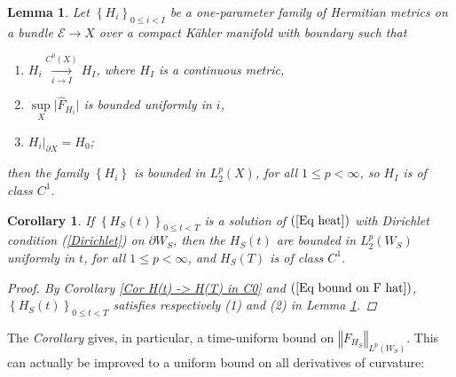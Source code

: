 \documentclass{article}
\newtheorem{corollary}[theorem]{Corollary}
\newtheorem{lemma}[theorem]{Lemma}
\begin{document}
\begin{lemma}           \label{Lemma Hi is in Lp2}
Let $\left\{ H_{i}\right\} _{0\leq i< I}$ be a
one-parameter family of Hermitian metrics on a bundle $\mathcal{E}%
\rightarrow X$ over a compact K\"{a}hler manifold with boundary such that
\begin{enumerate}
        \item 
        $H_{i}\underset{i\to I}{\overset{C^{0}(X)}{\longrightarrow }}H_{I}$, where $H_{I}$ is a
continuous metric,
        \item 
        $\sup\limits_{X}\vert \hat{F}_{H_{i}}\vert $ is bounded
uniformly in $i$,
        \item 
        $\left. H_{i}\right\vert _{\partial X}=H_{0}$;
\end{enumerate}
then the family $\left\{ H_{i}\right\} $ is bounded in $L_{2}^{p}\left( X\right) $,
 for all $1\leq p<\infty $, so $H_{I}$ is of class $C^{1}$.
\end{lemma}

\begin{corollary}       \label{Cor Hs(T) is in Lp2}
If $\left\{ H_{S}\left( t\right)\right\} _{0\leq t<T}$ is a solution of $\left( \ref{Eq heat}\right) $ with Dirichlet condition (\ref{Dirichlet}) on $\partial W_{S}$, then the $H_{S}\left( t\right) $ are bounded in $L_{2}^{p}\left( W_{S}\right) $ uniformly in $t$, for all $1\leq p<\infty $, and $H_{S}\left( T\right)$ is of class $C^{1}$.
\begin{proof}
By \emph{Corollary \ref{Cor H(t) -> H(T) in C0} }and $\left( \ref{Eq bound
on F hat}\right) $, $\left\{ H_{S}\left( t\right) \right\} _{0\leq t<T}$
satisfies respectively (1) and (2) in  \emph{Lemma \ref{Lemma Hi is in Lp2}}.
\end{proof}
\end{corollary}

The \emph{Corollary} gives, in particular, a time-uniform bound on $\left\Vert
F_{H_{S}}\right\Vert _{L^{p}\left( W_{S}\right) }$. This can actually be
improved to a uniform bound on all derivatives of curvature:
\end{document}
